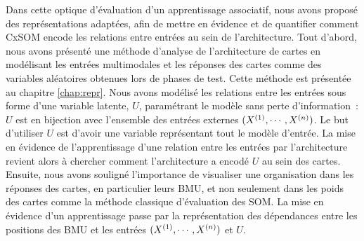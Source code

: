 Dans cette optique d'évaluation d'un apprentissage associatif, nous avons proposé des représentations adaptées, afin de mettre en évidence et de quantifier comment CxSOM encode les relations entre entrées au sein de l'architecture.
Tout d'abord, nous avons présenté une méthode d'analyse de l'architecture de cartes en modélisant les entrées multimodales et les réponses des cartes comme des variables aléatoires obtenues lors de phases de test. Cette méthode est présentée au chapitre \ref{chap:repr}.
Nous avons modélisé les relations entre les entrées sous forme d'une variable latente, $U$, paramétrant le modèle sans perte d'information~: $U$ est en bijection avec l'ensemble des entrées externes $(X^{({1})}, \cdots, X^{({n})})$. 
Le but d'utiliser $U$ est d'avoir une variable représentant tout le modèle d'entrée.
La mise en évidence de l'apprentissage d'une relation entre les entrées par l'architecture revient alors à chercher comment l'architecture a encodé $U$ au sein des cartes.
Ensuite, nous avons souligné l'importance de visualiser une organisation dans les réponses des cartes, en particulier leurs BMU, et non seulement dans les poids des cartes comme la méthode classique d'évaluation des SOM. La mise en évidence d'un apprentissage passe par la représentation des dépendances entre les positions des BMU et les entrées $(X^{({1})}, \cdots, X^{({n})})$ et $U$.

